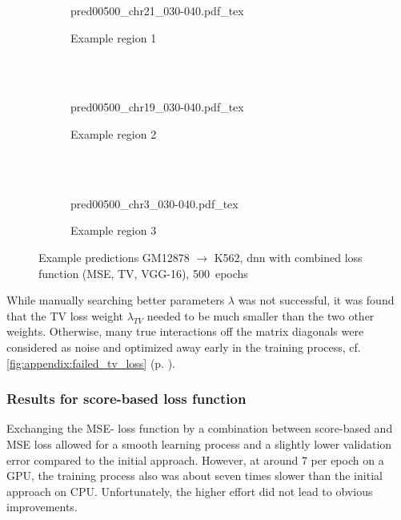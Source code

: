 \begin{figure}[p]
    \begin{subfigure}{\textwidth}
        \centering
        \scriptsize
        {pred00500_chr21_030-040.pdf_tex}
        \caption{Example  region 1} \label{fig:results:combiloss_r1}
    \end{subfigure}\\[2mm]
    \\[3mm]
    \begin{subfigure}{\textwidth}
        \centering
        \scriptsize
        {pred00500_chr19_030-040.pdf_tex}
        \caption{Example region 2} \label{fig:results:combiloss_r2}
    \end{subfigure}\\[2mm]
    \\[3mm]
    \begin{subfigure}{\textwidth}
        \centering
        \scriptsize
        {pred00500_chr3_030-040.pdf_tex}
        \caption{Example region 3} \label{fig:results:combiloss_r3}
    \end{subfigure}
    \caption{Example predictions GM12878 $\rightarrow$ K562, \acrshort{dnn} with combined loss function (MSE, TV, VGG-16), 500~epochs} \label{fig:results:combiloss_matrices}
\end{figure}
While manually searching better parameters $\lambda$ was not successful,
it was found that the TV loss weight $\lambda_\mathit{TV}$ needed to be much smaller than the two other weights.
Otherwise, many true interactions off the matrix diagonals were considered as noise and optimized away early in the training process, cf.
\cref{fig:appendix:failed_tv_loss} (p. \pageref{fig:appendix:failed_tv_loss}).

\subsubsection{Results for score-based loss function} \label{sec:results:scorebased}
Exchanging the MSE- loss function by a combination between score-based and MSE loss
allowed for a smooth learning process and a slightly lower validation error compared to the initial approach.
However, at around \SI{7}{\min} per epoch on a GPU, the training process also was about seven times slower than the initial approach on CPU.
Unfortunately, the higher effort did not lead to obvious improvements.

